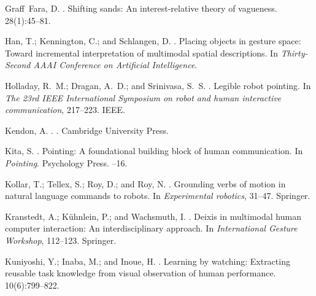\documentclass[letterpaper]{article} %
\begin{document}
\begin{thebibliography}{}
Graff~Fara, D.
.
\newblock Shifting sands: An interest-relative theory of vagueness.
 28(1):45--81.

Han, T.; Kennington, C.; and Schlangen, D.
.
\newblock Placing objects in gesture space: Toward incremental interpretation
  of multimodal spatial descriptions.
\newblock In {\em Thirty-Second AAAI Conference on Artificial Intelligence}.

Holladay, R.~M.; Dragan, A.~D.; and Srinivasa, S.~S.
.
\newblock Legible robot pointing.
\newblock In {\em The 23rd IEEE International Symposium on robot and human
  interactive communication},  217--223.
\newblock IEEE.

Kendon, A.
.
.
\newblock Cambridge University Press.

Kita, S.
.
\newblock Pointing: A foundational building block of human communication.
\newblock In {\em Pointing}. Psychology Press.
--16.

Kollar, T.; Tellex, S.; Roy, D.; and Roy, N.
.
\newblock Grounding verbs of motion in natural language commands to robots.
\newblock In {\em Experimental robotics},  31--47.
\newblock Springer.

Kranstedt, A.; K{\"u}hnlein, P.; and Wachsmuth, I.
.
\newblock Deixis in multimodal human computer interaction: An interdisciplinary
  approach.
\newblock In {\em International Gesture Workshop},  112--123.
\newblock Springer.

Kuniyoshi, Y.; Inaba, M.; and Inoue, H.
.
\newblock Learning by watching: Extracting reusable task knowledge from visual
  observation of human performance.
 10(6):799--822.


\end{thebibliography}
\end{document}
